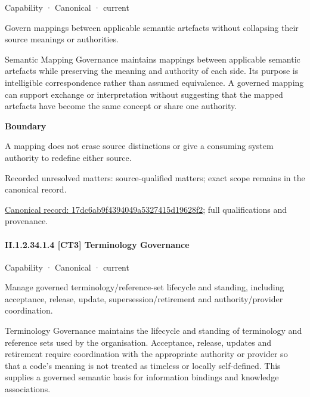 \label{element:17dc6ab9f4394049a5327415d19628f2}
{\small Capability · Canonical · current}\par

Govern mappings between applicable semantic artefacts without collapsing their source meanings or authorities.



Semantic Mapping Governance maintains mappings between applicable semantic artefacts while preserving the meaning and authority of each side. Its purpose is intelligible correspondence rather than assumed equivalence. A governed mapping can support exchange or interpretation without suggesting that the mapped artefacts have become the same concept or share one authority.



\textbf{Boundary}



A mapping does not erase source distinctions or give a consuming system authority to redefine either source.


{\small Recorded unresolved matters: source-qualified matters; exact scope remains in the canonical record.}\par
{\footnotesize \href{../../../../continuum/strategy/capability/17dc6ab9f4394049a5327415d19628f2.md}{Canonical record: 17dc6ab9f4394049a5327415d19628f2}; full qualifications and provenance.}\par
\paragraph*{II.1.2.34.1.4 [CT3] Terminology Governance}
\label{navigation:II.1.2.34.1.4}

\label{element:e926a47881fa482088859f59fa6fe7e4}
{\small Capability · Canonical · current}\par

Manage governed terminology/reference-set lifecycle and standing, including acceptance, release, update, supersession/retirement and authority/provider coordination.



Terminology Governance maintains the lifecycle and standing of terminology and reference sets used by the organisation. Acceptance, release, updates and retirement require coordination with the appropriate authority or provider so that a code's meaning is not treated as timeless or locally self-defined. This supplies a governed semantic basis for information bindings and knowledge associations.



